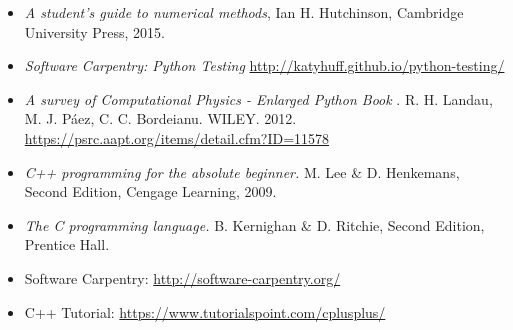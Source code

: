 \documentclass[letterpaper,10pt,onecolumn]{article}
\begin{document}
\begin{itemize}

\item 
\textit{A student's guide to numerical methods}, Ian H. Hutchinson, Cambridge University Press, 2015.

\item
\textit{Software Carpentry: Python Testing}
\url{http://katyhuff.github.io/python-testing/}

\item
\textit{A survey of Computational Physics - Enlarged Python Book}
. R. H. Landau, M. J. P\'aez, C. C. Bordeianu. WILEY. 2012.
\url{https://psrc.aapt.org/items/detail.cfm?ID=11578}

\item
\textit{C++ programming for the absolute beginner.}
 M. Lee \& D. Henkemans, Second Edition, Cengage Learning, 2009.

\item
\textit{The C programming language.}
 B. Kernighan \& D. Ritchie, Second Edition, Prentice Hall.

\item Software Carpentry: \url{http://software-carpentry.org/}
\item C++ Tutorial: \url{https://www.tutorialspoint.com/cplusplus/}
\end{itemize}
\end{document}
